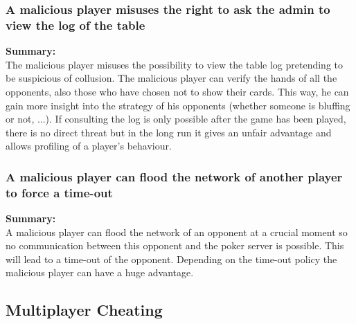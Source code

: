 \documentclass[a4paper,11pt]{report}
\begin{document}
\subsubsection{A malicious player misuses the right to ask the admin to view the log of the table}
\textbf{Summary:} \\
The malicious player misuses the possibility to view the table log pretending to be suspicious of collusion. The malicious player can verify the hands of all the opponents, also those who have chosen not to show their cards. This way, he can gain more insight into the strategy of his opponents (whether someone is bluffing or not, ...). If consulting the log is only possible after the game has been played, there is no direct threat but in the long run it gives an unfair advantage and allows profiling of a player's behaviour.

\subsubsection{A malicious player can flood the network of another player to force a time-out}
\textbf{Summary:} \\
A malicious player can flood the network of an opponent at a crucial moment so no communication between this opponent and the poker server is possible. This will lead to a time-out of the opponent. Depending on the time-out policy the malicious player can have a huge advantage.

\subsection{Multiplayer Cheating}
\end{document}
